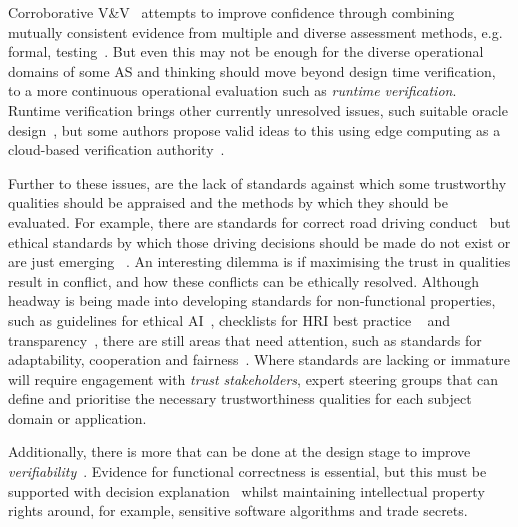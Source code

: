 
Corroborative V\&V~\cite{webster2020corroborative} attempts to improve confidence through combining mutually consistent evidence from multiple and diverse assessment methods, e.g. formal, testing~\cite{schwamm2022}. 
%
But even this may not be enough for the diverse operational domains of some AS and thinking should move beyond design time verification, to a more continuous operational evaluation such as \emph{runtime verification}. Runtime verification brings other currently unresolved issues, such suitable oracle design~\cite{Leucker2009}, but some authors propose valid ideas to this using edge computing as a cloud-based verification authority~\cite{CyRes20,eder2021cyres}. 
%

Further to these issues, are the lack of standards against which some trustworthy qualities should be appraised and the methods by which they should be evaluated. For example, there are standards for correct road driving conduct~\cite{highwayCode} but ethical standards by which those driving decisions should be made do not exist or are just emerging~\cite{Bonnefon2016} . 
%
An interesting dilemma is if maximising the trust in qualities result in conflict, and how these conflicts can be ethically resolved. 
%
Although headway is being made into developing standards for non-functional properties, such as guidelines for ethical AI~\cite{Floridi2018}, checklists for HRI best practice ~\cite{kraus2022trustworthy} and transparency~\cite{winfield2021ieee}, there are still areas that need attention, such as standards for adaptability, cooperation and fairness~\cite{Abeywickrama2022}. 
%
Where standards are lacking or immature will require engagement with \emph{trust stakeholders}, expert steering groups that can define and prioritise the necessary trustworthiness qualities for each subject domain or application. 

Additionally, there is more that can be done at the design stage to improve \emph{verifiability}~\cite{kusters2010}. Evidence for functional correctness is essential, but this must be supported with decision explanation~\cite{koopman2018toward} whilst maintaining intellectual property rights around, for example, sensitive software algorithms and trade secrets. 

